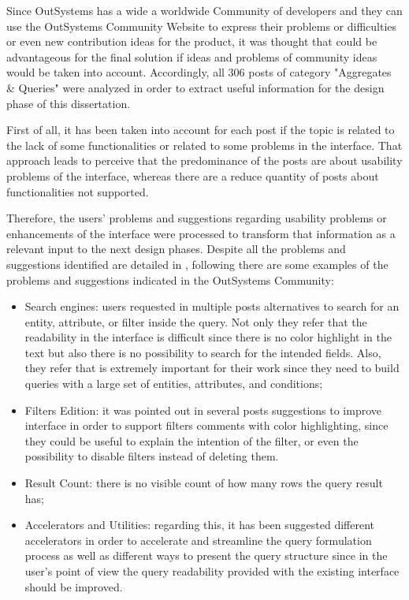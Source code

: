 Since OutSystems has a wide a worldwide Community of developers and they can use the OutSystems Community Website \cite{outsystems_community} to express their problems or difficulties or even new contribution ideas for the product, it was thought that could be advantageous for the final solution if ideas and problems of community ideas would be taken into account. Accordingly, all 306 posts of category "Aggregates \& Queries" were analyzed in order to extract useful information for the design phase of this dissertation.

First of all, it has been taken into account for each post if the topic is related to the lack of some functionalities or related to some problems in the interface. That approach leads to perceive that the predominance of the posts are about usability problems of the interface, whereas there are a reduce quantity of posts about functionalities not supported.

Therefore, the users’ problems and suggestions regarding usability problems or enhancements of the interface were processed to transform that information as a relevant input to the next design phases. Despite all the problems and suggestions identified are detailed in , following there are some examples of the problems and suggestions  indicated in the OutSystems Community:

\begin{itemize}
    \item Search engines: users requested in multiple posts alternatives to search for an entity, attribute, or filter inside the query. Not only they refer that the readability in the interface is difficult since there is no color highlight in the text but also there is no possibility to search for the intended fields. Also, they refer that is extremely important for their work since they need to build queries with a large set of entities, attributes, and conditions;
    \item Filters Edition: it was pointed out in several posts suggestions to improve interface in order to support filters comments with color highlighting, since they could be useful to explain the intention of the filter, or even the possibility to disable filters instead of deleting them.  
    \item Result Count: there is no visible count of how many rows the query result has;
    \item Accelerators and Utilities: regarding this, it has been suggested different accelerators in order to accelerate and streamline the query formulation process as well as different ways to present the query structure since in the user's point of view the query readability provided with the existing interface should be improved.
\end{itemize}

